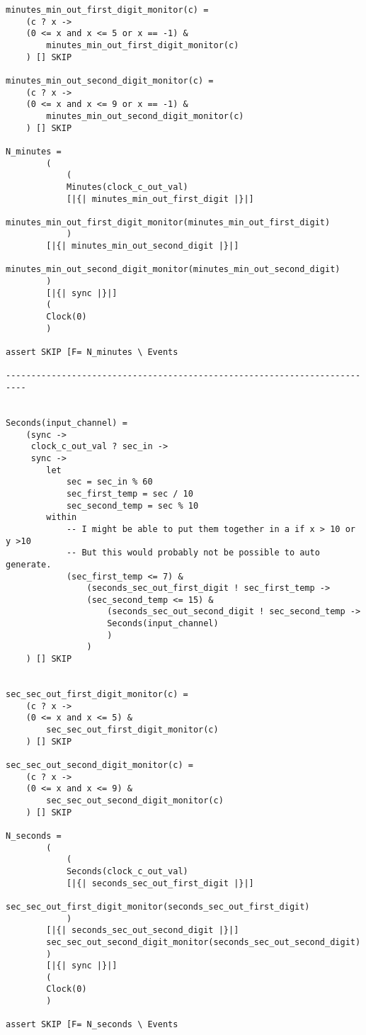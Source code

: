 \begin{verbatim}
minutes_min_out_first_digit_monitor(c) =
    (c ? x ->
    (0 <= x and x <= 5 or x == -1) &
        minutes_min_out_first_digit_monitor(c)
    ) [] SKIP

minutes_min_out_second_digit_monitor(c) =
    (c ? x ->
    (0 <= x and x <= 9 or x == -1) &
        minutes_min_out_second_digit_monitor(c)
    ) [] SKIP

N_minutes =
        (
            (
            Minutes(clock_c_out_val)
            [|{| minutes_min_out_first_digit |}|]
            minutes_min_out_first_digit_monitor(minutes_min_out_first_digit)
            )
        [|{| minutes_min_out_second_digit |}|]
        minutes_min_out_second_digit_monitor(minutes_min_out_second_digit)
        )
        [|{| sync |}|]
        (
        Clock(0)
        )

assert SKIP [F= N_minutes \ Events

--------------------------------------------------------------------------


Seconds(input_channel) =
    (sync ->
     clock_c_out_val ? sec_in ->
     sync ->
        let
            sec = sec_in % 60
            sec_first_temp = sec / 10
            sec_second_temp = sec % 10
        within
            -- I might be able to put them together in a if x > 10 or y >10
            -- But this would probably not be possible to auto generate.
            (sec_first_temp <= 7) &
                (seconds_sec_out_first_digit ! sec_first_temp ->
                (sec_second_temp <= 15) &
                    (seconds_sec_out_second_digit ! sec_second_temp ->
                    Seconds(input_channel)
                    )
                )
    ) [] SKIP


sec_sec_out_first_digit_monitor(c) =
    (c ? x ->
    (0 <= x and x <= 5) &
        sec_sec_out_first_digit_monitor(c)
    ) [] SKIP

sec_sec_out_second_digit_monitor(c) =
    (c ? x ->
    (0 <= x and x <= 9) &
        sec_sec_out_second_digit_monitor(c)
    ) [] SKIP

N_seconds =
        (
            (
            Seconds(clock_c_out_val)
            [|{| seconds_sec_out_first_digit |}|]
            sec_sec_out_first_digit_monitor(seconds_sec_out_first_digit)
            )
        [|{| seconds_sec_out_second_digit |}|]
        sec_sec_out_second_digit_monitor(seconds_sec_out_second_digit)
        )
        [|{| sync |}|]
        (
        Clock(0)
        )

assert SKIP [F= N_seconds \ Events
\end{verbatim}


